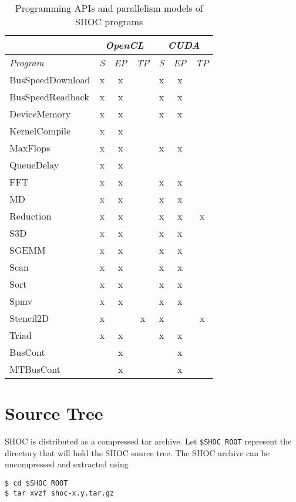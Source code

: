 \documentclass[11pt]{article}
\begin{document}
\begin{table}
\centering
\begin{tabular}{|l|c|c|c|c|c|c|}
\hline
 & \multicolumn{3}{c|}{\em OpenCL} & \multicolumn{3}{c|}{\em CUDA} \\
\hline
{\em Program} & {\em S} & {\em EP} & {\em TP} & {\em S} & {\em EP} & {\em TP} \\
\hline\hline
BusSpeedDownload    & x & x &   & x & x &   \\
BusSpeedReadback    & x & x &   & x & x &   \\
DeviceMemory        & x & x &   & x & x &   \\
KernelCompile       & x & x &   &   &   &   \\
MaxFlops            & x & x &   & x & x &   \\
QueueDelay          & x & x &   &   &   &   \\
FFT                 & x & x &   & x & x &   \\
MD                  & x & x &   & x & x &   \\
Reduction           & x & x &   & x & x & x \\
S3D                 & x & x &   & x & x &   \\
SGEMM               & x & x &   & x & x &   \\
Scan                & x & x &   & x & x &   \\
Sort                & x & x &   & x & x &   \\
Spmv                & x & x &   & x & x &   \\
Stencil2D           & x &   & x & x &   & x \\
Triad               & x & x &   & x & x &   \\
BusCont             &   & x &   &   & x &   \\
MTBusCont           &   & x &   &   & x &   \\
\hline
\end{tabular}
\caption{Programming APIs and parallelism models of SHOC programs}
\end{table}

\section{Source Tree}\label{sec:source}

SHOC is distributed as a compressed tar archive.
Let \verb+$SHOC_ROOT+ represent the directory that will hold the SHOC source
tree.
The SHOC archive can be uncompressed and extracted using 
\begin{Verbatim}[frame=single]
$ cd $SHOC_ROOT
$ tar xvzf shoc-x.y.tar.gz
\end{Verbatim}
\end{document}
